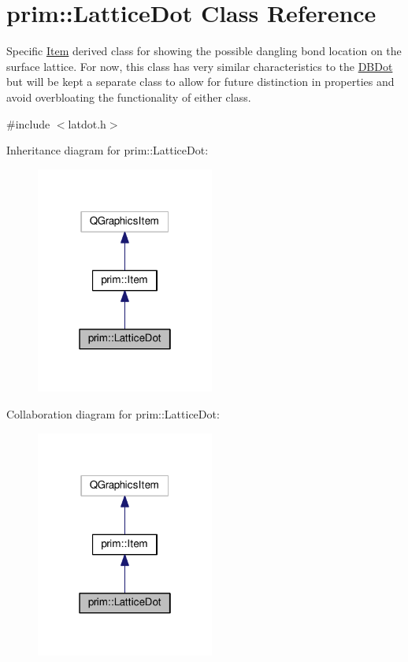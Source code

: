 \hypertarget{classprim_1_1LatticeDot}{}\section{prim\+:\+:Lattice\+Dot Class Reference}
\label{classprim_1_1LatticeDot}


Specific \hyperlink{classprim_1_1Item}{Item} derived class for showing the possible dangling bond location on the surface lattice. For now, this class has very similar characteristics to the \hyperlink{classprim_1_1DBDot}{D\+B\+Dot} but will be kept a separate class to allow for future distinction in properties and avoid overbloating the functionality of either class.  




{\ttfamily \#include $<$latdot.\+h$>$}



Inheritance diagram for prim\+:\+:Lattice\+Dot\+:\nopagebreak
\begin{figure}[H]
\begin{center}
\leavevmode
\includegraphics[width=166pt]{classprim_1_1LatticeDot__inherit__graph}
\end{center}
\end{figure}


Collaboration diagram for prim\+:\+:Lattice\+Dot\+:\nopagebreak
\begin{figure}[H]
\begin{center}
\leavevmode
\includegraphics[width=166pt]{classprim_1_1LatticeDot__coll__graph}
\end{center}
\end{figure}
